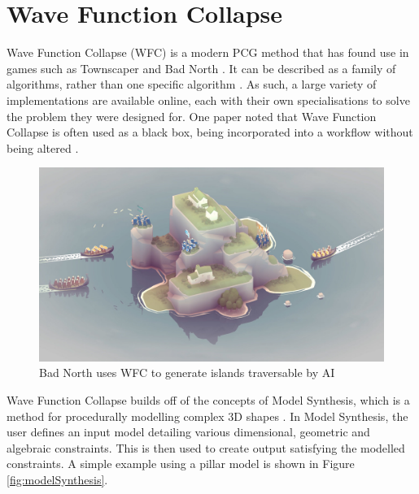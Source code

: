 
\section{Wave Function Collapse}
Wave Function Collapse (WFC) \cite{Gumin_Wave_Function_Collapse_2016} is a modern PCG method that has found use in games such as Townscaper \cite{townscaper} and Bad North \cite{badnorth}. It can be described as a family of algorithms, rather than one specific algorithm \cite{WFC_ConstraintSolving_and_ML}. As such, a large variety of implementations are available online, each with their own specialisations to solve the problem they were designed for. One paper noted that Wave Function Collapse is often used as a black box, being incorporated into a workflow without being altered \cite{WFC_In_The_Wild}.

\begin{figure}[H]
    \centering
    \includegraphics[width=\textwidth, height=0.3\textheight, keepaspectratio]{Images/BadNorth.jpg}
    \caption{Bad North uses WFC to generate islands traversable by AI \cite{badnorth}}
    \label{fig:badNorth}
\end{figure}

Wave Function Collapse builds off of the concepts of Model Synthesis, which is a method for procedurally modelling complex 3D shapes \cite{model_synthesis, model_synthesis_diss}. In Model Synthesis, the user defines an input model detailing various dimensional, geometric and algebraic constraints. This is then used to create output satisfying the modelled constraints. A simple example using a pillar model is shown in Figure \ref{fig:modelSynthesis}.

